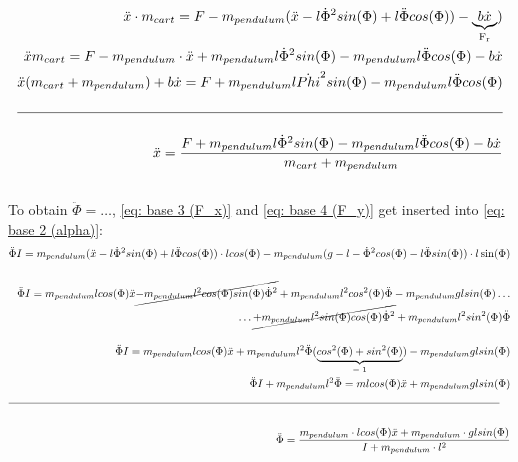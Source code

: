     \begin{align}\label{eq: final eq for x ddot}
        \ddot{x} \cdot m_{cart} = F-m_{pendulum}(\ddot{x}-l\dot{\Phi}^2 sin(\Phi)+l \ddot{\Phi} cos (\Phi))-\underbrace{b\dot{x}}_\text{F\textsubscript{r}})\notag \\
         \ddot{x} m_{cart} = F-m_{pendulum}\cdot\ddot{x}+m_{pendulum}l\dot{\Phi}^2 sin(\Phi)-m_{pendulum}l\ddot{\Phi}cos(\Phi)-b\dot{x}\notag \\
         \ddot{x}(m_{cart}+m_{pendulum})+b\dot{x}=F+m_{pendulum}l\dot{Phi}^2 sin(\Phi)-m_{pendulum}l\ddot{\Phi}cos(\Phi)\notag \\\notag \\\hline \notag \\
         \ddot{x} = \frac{F+m_{pendulum}l\dot{\Phi}^2 sin(\Phi)-m_{pendulum}l\ddot{\Phi}cos(\Phi)-b\dot{x}}{m_{cart}+m_{pendulum}}
    \end{align}
    \\
    To obtain $\ddot{\Phi} = \dots$, \autoref{eq: base 3 (F_x)} and \autoref{eq: base 4 (F_y)} get inserted into \autoref{eq: base 2 (alpha)}:
    \begin{align} \label{eq: final eq for Phi ddot}
        \ddot{\Phi} I = m_{pendulum} (\ddot{x} - l\dot{\Phi}^2 sin(\Phi) + l\ddot{\Phi} cos(\Phi))\cdot lcos(\Phi)-m_{pendulum}(g-l-\dot{\Phi}^2 cos(\Phi)-l\ddot{\Phi}sin(\Phi))\cdot l\sin(\Phi)\notag \\\notag\\
        \ddot{\Phi} I = m_{pendulum} l cos(\Phi) \ddot{x} \cancel{- m_{pendulum} l^2 cos(\Phi) sin(\Phi) \dot{\Phi}^2} + m_{pendulum} l^2 cos^2(\Phi) \ddot{\Phi} - m_{pendulum}g l sin(\Phi) \dots \notag\\ \dots \cancel{+m_{pendulum}l^2 sin(\Phi)cos(\Phi)\dot{\Phi}^2}+m_{pendulum}l^2 sin^2(\Phi)\ddot{\Phi}\notag \\\notag \\
        \ddot{\Phi} I = m_{pendulum} l cos(\Phi) \ddot{x} + m_{pendulum} l^2 \ddot{\Phi} (\underbrace{cos^2(\Phi)+sin^2(\Phi)}_\text{= 1})-m_{pendulum} g l sin(\Phi)\notag \\
         \ddot{\Phi} I + m_{pendulum}l^2\ddot{\Phi} = m l cos(\Phi)\ddot{x} + m_{pendulum} g l sin(\Phi)\notag \\\cline{1-2}\notag \\
         \ddot{\Phi} = \frac{m_{pendulum}\cdot lcos(\Phi)\ddot{x}+m_{pendulum}\cdot glsin(\Phi)}{I+m_{pendulum}\cdot l^2}
    \end{align}

